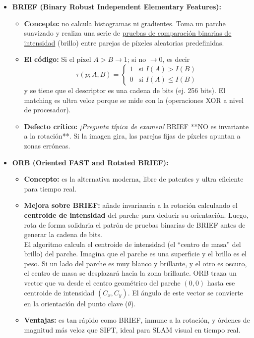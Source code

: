 \begin{itemize}
    \item \textbf{BRIEF (Binary Robust Independent Elementary Features):}
    \begin{itemize}
        \item \textbf{Concepto:} no calcula histogramas ni gradientes. Toma un parche suavizado y realiza una serie de \underline{pruebas de comparación binarias de intensidad} (brillo) entre parejas de píxeles aleatorias predefinidas.
        \item \textbf{El código:} Si el píxel $A > B \rightarrow 1$; si no $\rightarrow 0$, es decir
        $$\tau(p; A, B) = \begin{cases} 1 & \text{si } I(A) > I(B) \\ 0 & \text{si } I(A) \le I(B) \end{cases}$$
        y se tiene que el descriptor es una cadena de bits (ej. 256 bits). El matching es ultra veloz porque se mide con la  (operaciones XOR a nivel de procesador).
        \item \textbf{Defecto crítico:} \textit{¡Pregunta típica de examen!} BRIEF **NO es invariante a la rotación**. Si la imagen gira, las parejas fijas de píxeles apuntan a zonas erróneas.
    \end{itemize}
    
    \item \textbf{ORB (Oriented FAST and Rotated BRIEF):}
    \begin{itemize}
        \item \textbf{Concepto:} es la alternativa moderna, libre de patentes y ultra eficiente para tiempo real.
        \item \textbf{Mejora sobre BRIEF:} añade invariancia a la rotación calculando el \textbf{centroide de intensidad} del parche para deducir su orientación. Luego, rota de forma solidaria el patrón de pruebas binarias de BRIEF antes de generar la cadena de bits. \\
        
        \noindent
        El algoritmo calcula el centroide de intensidad (el ``centro de masa'' del brillo) del parche. Imagina que el parche es una superficie y el brillo es el peso. Si un lado del parche es muy blanco y brillante, y el otro es oscuro, el centro de masa se desplazará hacia la zona brillante. ORB traza un vector que va desde el centro geométrico del parche $(0,0)$ hasta ese centroide de intensidad $(C_x, C_y)$. El ángulo de este vector se convierte en la orientación del punto clave ($\theta$).

        \item \textbf{Ventajas:} es tan rápido como BRIEF, inmune a la rotación, y órdenes de magnitud más veloz que SIFT, ideal para SLAM visual en tiempo real.
    \end{itemize}
\end{itemize}

